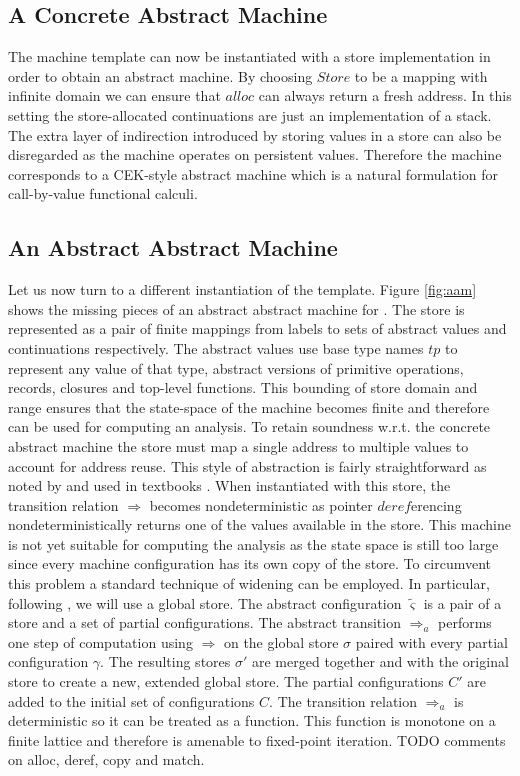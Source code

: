 \subsection*{A Concrete Abstract Machine}
The machine template can now be instantiated with a store implementation in order to obtain an abstract machine.
By choosing $\mathit{Store}$ to be a mapping with infinite domain we can ensure that $\mathit{alloc}$ can always return a fresh address.
In this setting the store-allocated continuations are just an implementation of a stack.
The extra layer of indirection introduced by storing values in a store can also be disregarded as the machine operates on persistent values.
Therefore the machine corresponds to a CEK-style abstract machine which is a natural \cite{functional-correspondence} formulation for call-by-value functional calculi.

\subsection*{An Abstract Abstract Machine}\label{ss:aam}
Let us now turn to a different instantiation of the template.
Figure \ref{fig:aam} shows the missing pieces of an abstract abstract machine for \IDL{}.
The store is represented as a pair of finite mappings from labels to sets of abstract values and continuations respectively.
The abstract values use base type names $tp$ to represent any value of that type, abstract versions of primitive operations, records, closures and top-level functions.
This bounding of store domain and range ensures that the state-space of the machine becomes finite and therefore can be used for computing an analysis.
To retain soundness w.r.t. the concrete abstract machine the store must map a single address to multiple values to account for address reuse.
This style of abstraction is fairly straightforward as noted by \cite{aam} and used in textbooks \cite{popa}.
When instantiated with this store, the transition relation $\Rightarrow$ becomes nondeterministic as pointer $\mathit{deref}$erencing nondeterministically returns one of the values available in the store.
This machine is not yet suitable for computing the analysis as the state space is still too large since every machine configuration has its own copy of the store.
To circumvent this problem a standard technique of widening \cite{popa} can be employed.
In particular, following \cite{aam}, we will use a global store.
The abstract configuration $\tilde{\varsigma}$ is a pair of a store and a set of partial configurations.
The abstract transition $\Rightarrow_a$ performs one step of computation using $\Rightarrow$ on the global store $\sigma$ paired with every partial configuration $\gamma$.
The resulting stores $\sigma'$ are merged together and with the original store to create a new, extended global store.
The partial configurations $C'$ are added to the initial set of configurations $C$.
The transition relation $\Rightarrow_a$ is deterministic so it can be treated as a function.
This function is monotone on a finite lattice and therefore is amenable to fixed-point iteration.
TODO comments on alloc, deref, copy and match.

